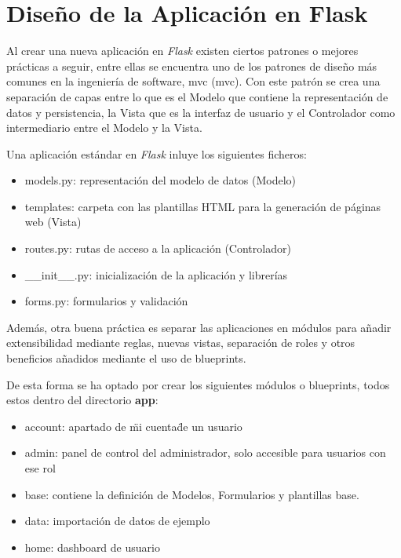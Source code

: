 \documentclass[11pt,spanish,listoffigures,listoftables]{tfgetsinf}
\begin{document}
\section{Diseño de la Aplicación en Flask}

Al crear una nueva aplicación en \textit{Flask} existen ciertos patrones o mejores prácticas a seguir, entre ellas se encuentra uno de los patrones de diseño más comunes en la ingeniería de software, \acrlong{mvc} (\acrshort{mvc}). Con este patrón se crea una separación de capas entre lo que es el Modelo que contiene la representación de datos y persistencia, la Vista que es la interfaz de usuario y el Controlador como intermediario entre el Modelo y la Vista.

Una aplicación estándar en \textit{Flask} inluye los siguientes ficheros:

\begin{itemize}
	\item models.py: representación del modelo de datos (Modelo)
	\item templates: carpeta con las plantillas HTML para la generación de páginas web (Vista)
	\item routes.py: rutas de acceso a la aplicación (Controlador)
	\item \_\_init\_\_.py: inicialización de la aplicación y librerías
	\item forms.py: formularios y validación
\end{itemize}

Además, otra buena práctica es separar las aplicaciones en módulos para añadir extensibilidad mediante reglas, nuevas vistas, separación de roles y otros beneficios añadidos mediante el uso de \foreignlanguage{english}{blueprints}.

De esta forma se ha optado por crear los siguientes módulos o \foreignlanguage{english}{blueprints}, todos estos dentro del directorio \textbf{app}:

\begin{itemize}
	\item account: apartado de \"mi cuenta\" de un usuario
	\item admin: panel de control del administrador, solo accesible para usuarios con ese rol
	\item base: contiene la definición de Modelos, Formularios y plantillas base.
	\item data: importación de datos de ejemplo
	\item home: \foreignlanguage{english}{dashboard} de usuario
\end{itemize}
\end{document}
